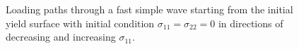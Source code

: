 \begin{figure}[h!]
  \centering
  \caption{Loading paths through a fast simple wave starting from the initial yield surface with initial condition $\sigma_{11}=\sigma_{22}=0 $ in directions of decreasing and increasing $\sigma_{11} $.}
  \label{fig:fast_path_plane_stress}
\end{figure}

%   

